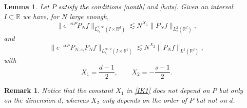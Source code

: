 \documentclass[10pt,leqno]{amsart}
\newtheorem{lem}[thm]{Lemma} %
\newtheorem{rmq}[thm]{Remark} %
\newcommand{\R}{\mathbb{R}} %
\numberwithin{equation}{section}
\begin{document}
\begin{lem}
\label{1lemIK}
Let \(P\) satisfy the conditions \eqref{aonth} and \eqref{hots}. Given an interval $I\subset \R$ we have, for $N$ large enough,
\begin{equation}\label{IK1}
\| e^{-it P }  P_N f\|_{L_{e_l}^{2,\infty} (I\times \R^d)}\lesssim N^{X_1} \|P_N f\|_{L_x^2 (\R^d )},
\end{equation}
and
\begin{equation}
\label{IK3}
\|e^{-it P}  P_{N, e_l }  P_N f \|_{L_{e_l}^{\infty ,2} (I \times \R^d)} \lesssim N^{X_2} \|P_N f\|_{L^2 (\R^d )},
\end{equation}
with
$$X_1 =\dfrac{d-1}{2} ,\qquad X_2= -\dfrac{s-1}{2}.$$
\end{lem}
\begin{rmq}
Notice that the constant $X_1$ in \eqref{IK1} does not depend on $P$ but only on the dimension $d$, whereas $X_2$ only depends on the order of $P$ but not on $d$.
\end{rmq}
\end{document}
